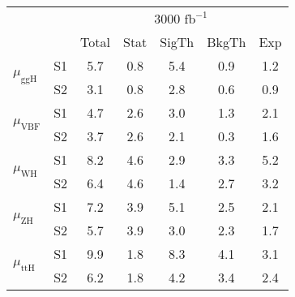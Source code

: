 \begin{tabular}{@{} l c c@{\hskip 0.15in} c c c c @{}}
 \hline
  &  & \multicolumn{5}{c}{3000 $\text{fb}^{-1}$} \\
  &  & Total & Stat & SigTh & BkgTh & Exp \\
 \hline
\multirow{2}{*}{$\mu_{\mathrm{ggH}}$} & S1  & 5.7& 0.8 & 5.4 & 0.9 & 1.2  \\[1pt]
                        & S2  & 3.1& 0.8 & 2.8 & 0.6 & 0.9  \\[4pt]
\multirow{2}{*}{$\mu_{\mathrm{VBF}}$} & S1  & 4.7& 2.6 & 3.0 & 1.3 & 2.1  \\[1pt]
                        & S2  & 3.7& 2.6 & 2.1 & 0.3 & 1.6  \\[4pt]
\multirow{2}{*}{$\mu_{\mathrm{WH}}$} & S1  & 8.2& 4.6 & 2.9 & 3.3 & 5.2  \\[1pt]
                        & S2  & 6.4& 4.6 & 1.4 & 2.7 & 3.2  \\[4pt]
\multirow{2}{*}{$\mu_{\mathrm{ZH}}$} & S1  & 7.2& 3.9 & 5.1 & 2.5 & 2.1  \\[1pt]
                        & S2  & 5.7& 3.9 & 3.0 & 2.3 & 1.7  \\[4pt]
\multirow{2}{*}{$\mu_{\mathrm{ttH}}$} & S1  & 9.9& 1.8 & 8.3 & 4.1 & 3.1  \\[1pt]
                        & S2  & 6.2& 1.8 & 4.2 & 3.4 & 2.4  \\[4pt]
\hline
\end{tabular}